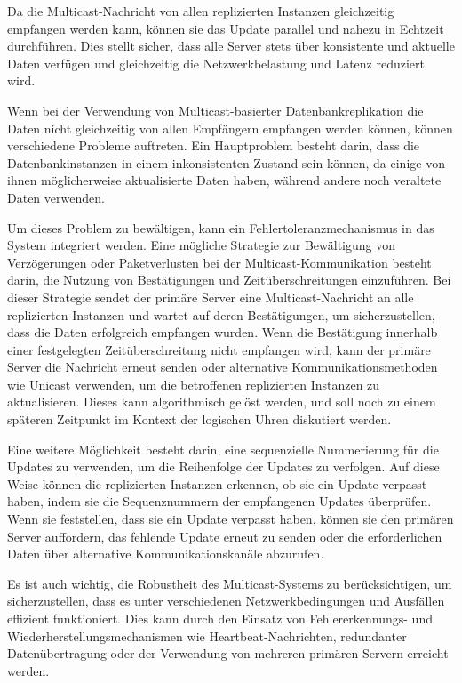 Da die Multicast-Nachricht von allen replizierten Instanzen gleichzeitig empfangen werden kann, können sie das Update parallel und nahezu in Echtzeit durchführen. Dies stellt sicher, dass alle Server stets über konsistente und aktuelle Daten verfügen und gleichzeitig die Netzwerkbelastung und Latenz reduziert wird.

Wenn bei der Verwendung von Multicast-basierter Datenbankreplikation die Daten nicht gleichzeitig von allen Empfängern empfangen werden können, können verschiedene Probleme auftreten. Ein Hauptproblem besteht darin, dass die Datenbankinstanzen in einem inkonsistenten Zustand sein können, da einige von ihnen möglicherweise aktualisierte Daten haben, während andere noch veraltete Daten verwenden.

Um dieses Problem zu bewältigen, kann ein Fehlertoleranzmechanismus in das System integriert werden. Eine mögliche Strategie zur Bewältigung von Verzögerungen oder Paketverlusten bei der Multicast-Kommunikation besteht darin, die Nutzung von Bestätigungen und Zeitüberschreitungen einzuführen. Bei dieser Strategie sendet der primäre Server eine Multicast-Nachricht an alle replizierten Instanzen und wartet auf deren Bestätigungen, um sicherzustellen, dass die Daten erfolgreich empfangen wurden. Wenn die Bestätigung innerhalb einer festgelegten Zeitüberschreitung nicht empfangen wird, kann der primäre Server die Nachricht erneut senden oder alternative Kommunikationsmethoden wie Unicast verwenden, um die betroffenen replizierten Instanzen zu aktualisieren. Dieses kann algorithmisch gelöst werden, und soll noch zu einem späteren Zeitpunkt im Kontext der logischen Uhren diskutiert werden. 

Eine weitere Möglichkeit besteht darin, eine sequenzielle Nummerierung für die Updates zu verwenden, um die Reihenfolge der Updates zu verfolgen. Auf diese Weise können die replizierten Instanzen erkennen, ob sie ein Update verpasst haben, indem sie die Sequenznummern der empfangenen Updates überprüfen. Wenn sie feststellen, dass sie ein Update verpasst haben, können sie den primären Server auffordern, das fehlende Update erneut zu senden oder die erforderlichen Daten über alternative Kommunikationskanäle abzurufen.

Es ist auch wichtig, die Robustheit des Multicast-Systems zu berücksichtigen, um sicherzustellen, dass es unter verschiedenen Netzwerkbedingungen und Ausfällen effizient funktioniert. Dies kann durch den Einsatz von Fehlererkennungs- und Wiederherstellungsmechanismen wie Heartbeat-Nachrichten, redundanter Datenübertragung oder der Verwendung von mehreren primären Servern erreicht werden.

